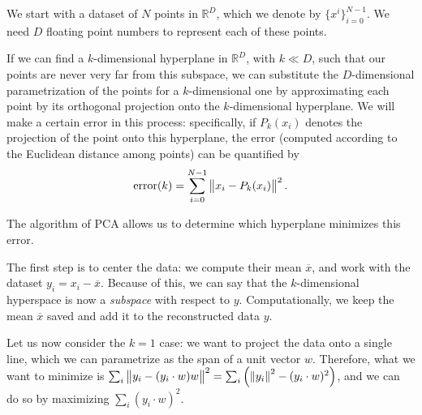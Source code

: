 \documentclass[main.tex]{subfiles}
\begin{document}
We start with a dataset of \(N\) points in \(\mathbb{R}^{D}\), which we denote by \(\{ x^{i}\}_{i=0}^{N-1}\).
We need \(D\) floating point numbers to represent each of these points.

If we can find a \(k\)-dimensional hyperplane in \(\mathbb{R}^{D}\), with \(k \ll D\), such that our points are never very far from this subspace, we can substitute the \(D\)-dimensional parametrization of the points for a \(k\)-dimensional one by approximating each point by its orthogonal projection onto the \(k\)-dimensional hyperplane. 
We will make a certain error in this process: specifically, if \(P_k(x_{i})\) denotes the projection of the point onto this hyperplane, the error (computed according to the Euclidean distance among points)
can be quantified by
%
\begin{align}
\text{error} (k) = \sum _{i=0}^{N-1} \norm{x_i - P_k(x_i)}^2
\,.
\end{align}

The algorithm of PCA allows us to determine which hyperplane minimizes this error. 

The first step is to center the data: we compute their mean \(\overline{x}\), and work with the dataset \(y_i = x_i - \overline{x}\). 
Because of this, we can say that the \(k\)-dimensional hyperspace is now a \emph{subspace} with respect to \(y\). 
Computationally, we keep the mean \(\overline{x}\) saved and add it to the reconstructed data \(y\). 

Let us now consider the \(k=1\) case: we want to project the data onto a single line, which we can parametrize as the span of a unit vector \(w\).
Therefore, what we want to minimize is \(\sum _{i} \norm{y_i - (y_i \cdot w) w}^2 = \sum _{i} \qty( \norm{y_i}^2 - (y_i \cdot w)^2)\), and we can do so by maximizing \(\sum _{i} (y_i \cdot w)^2\). 
\end{document}
